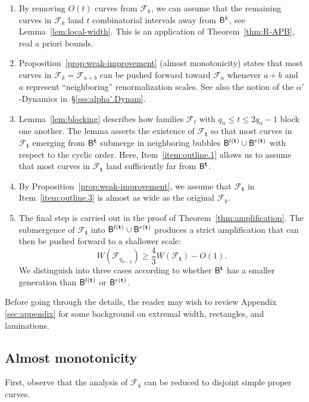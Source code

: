 \documentclass{amsart}
\begin{document}
\begin{enumerate}[label=\textnormal{(\arabic*)}]
    \item\label{item:outline.1}  By removing $O(t)$ curves from $\mathcal F_k$, we can assume that the remaining curves in  $\mathcal F_k$ land $t$ combinatorial intervals away from $\mathsf{B}^k$, see Lemma~\ref{lem:local-width}. This is an application of Theorem~\ref{thm:R-APB}, real a priori bounds.
    \item Proposition~\ref{prop:weak-improvement} (almost monotonicity) states that most curves in $\mathcal F_k=\mathcal F_{a+b}$ can be pushed forward toward $\mathcal F_{a}$ whenever $a+b$ and $a$ represent ``neighboring'' renormalization scales. See also the notion of the $\alpha'$-Dynamics in~\S\ref{sss:alpha'.Dynam}. 
    \item\label{item:outline.3} Lemma~\ref{lem:blocking} describes how families $\mathcal F_t$ with $q_n \le t\le 2q_{n}-1$ block one another. The lemma asserts the existence of $\mathcal{F}_{\mathbf{t}}$ so that most curves in $\mathcal{F}_{\mathbf{t}}$ emerging from $\mathsf{B}^{\mathbf{t}}$ submerge in neighboring bubbles $\mathsf{B}^{l({\mathbf{t}})}\cup \mathsf{B}^{r({\mathbf{t}})}$ with respect to the cyclic order. Here, Item~\ref{item:outline.1} allows us to assume that most curves in $\mathcal{F}_{\mathbf{t}}$ land sufficiently far from $\mathsf{B}^{\mathbf{t}}$.
    
    \item By Proposition~\ref{prop:weak-improvement}, we assume that $\mathcal{F}_{\mathbf{t}}$ in Item~\ref{item:outline.3} is almost as wide as the original $\mathcal F_k$.
     \item\label{item:outline.5} The final step is carried out in the proof of Theorem~\ref{thm:amplification}. The submergence of $\mathcal{F}_{\mathbf{t}}$ into $\mathsf{B}^{l({\mathbf{t}})}\cup \mathsf{B}^{r({\mathbf{t}})}$ produces a strict amplification that can then be pushed forward to a shallower scale:
    \[
    W(\mathcal{F}_{q_{n-2}}) \geq \frac{4}{3} W(\mathcal{F}_{\mathbf{t}}) - O(1).
    \]
     We distinguish into three cases according to whether $\mathsf{B}^{\mathbf{t}}$ has a smaller generation than $\mathsf{B}^{l({\mathbf{t}})}$ or $\mathsf{B}^{r({\mathbf{t}})}$.
\end{enumerate}

Before going through the details, the reader may wish to review Appendix \ref{sec:appendix} for some background on extremal width, rectangles, and laminations.

\subsection{Almost monotonicity}
\label{ss:preparation}
First, observe that the analysis of $\mathcal{F}_k$ can be reduced to disjoint simple proper curves.
\end{document}
